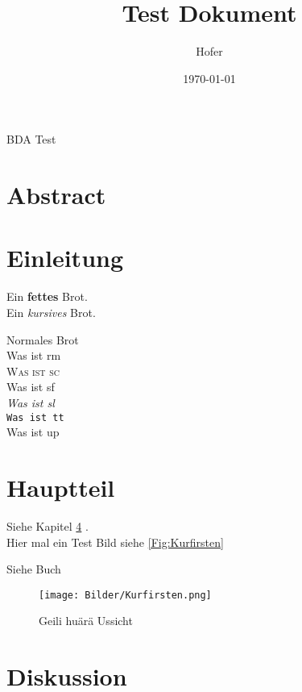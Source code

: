 \documentclass[11pt]{article}
\title{Test Dokument}
\author{Hofer}
\date{\today}
\begin{document}
\maketitle
BDA Test


\clearpage
\tableofcontents

\clearpage
\section{Abstract}

\lipsum

\clearpage
\section{Einleitung}


Ein \textbf{fettes} Brot.
\\Ein \textit{kursives} Brot.

Normales Brot\\
\textrm{Was ist rm}\\
\textsc{Was ist sc}\\
\textsf{Was ist sf}\\
\textsl{Was ist sl}\\
\texttt{Was ist tt}\\
\textup{Was ist up}\\


\clearpage
\section{Hauptteil}

Siehe Kapitel \ref{sec:diskusion} .\\
Hier mal ein Test Bild siehe \autoref{Fig:Kurfirsten}

Siehe Buch \cite{tietze1978advanced}

\begin{figure}[h!] %
\centering %
\texttt{[image: Bilder/Kurfirsten.png]}%
\caption{Geili huärä Ussicht}
\label{Fig:Kurfirsten}
\end{figure}


\clearpage
\section{Diskussion}

\label{sec:diskusion}












\clearpage
\nocite{*}
\end{document}
